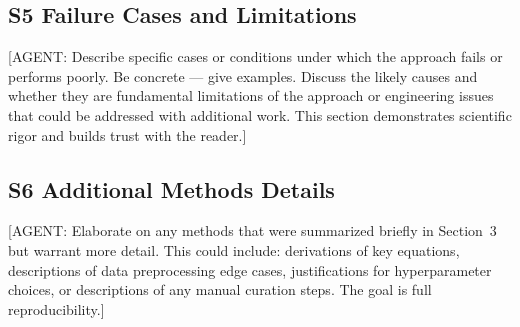 \documentclass[9pt,a4paper,twocolumn,twoside]{rho-class/rho}
\begin{document}
    \subsection*{S5 \quad Failure Cases and Limitations}

        [AGENT: Describe specific cases or conditions under
        which the approach fails or performs poorly. Be
        concrete — give examples. Discuss the likely
        causes and whether they are fundamental limitations
        of the approach or engineering issues that could be
        addressed with additional work. This section
        demonstrates scientific rigor and builds trust
        with the reader.]

    \subsection*{S6 \quad Additional Methods Details}

        [AGENT: Elaborate on any methods that were
        summarized briefly in Section~3 but warrant more
        detail. This could include: derivations of key
        equations, descriptions of data preprocessing
        edge cases, justifications for hyperparameter
        choices, or descriptions of any manual curation
        steps. The goal is full reproducibility.]

\end{document}
